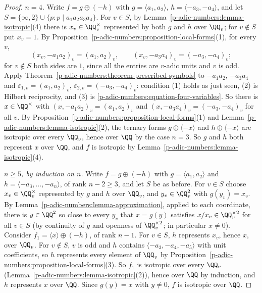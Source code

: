 \begin{proof}
\emph{$n = 4$.} Write $f = g \oplus (-h)$ with $g = \langle a_1, a_2\rangle$, $h = \langle -a_3, -a_4\rangle$, and let $S = \{\infty, 2\} \cup \{p : p \mid a_1a_2a_3a_4\}$. For $v \in S$, by
Lemma~\ref{p-adic-numbers:lemma-isotropic}(4) there is $x_v \in \QQ_v^\times$ represented by both $g$ and $h$ over $\QQ_v$; for $v \notin S$ put $x_v = 1$. By Proposition~\ref{p-adic-numbers:proposition-local-forms}(1),
for every $v$,
\begin{equation}\label{p-adic-numbers:equation-four-variables}
(x_v, -a_1a_2)_v = (a_1, a_2)_v, \qquad (x_v, -a_3a_4)_v = (-a_3, -a_4)_v ;
\end{equation}
for $v \notin S$ both sides are $1$, since all the entries are $v$-adic units and $v$ is odd. Apply Theorem~\ref{p-adic-numbers:theorem-prescribed-symbols} to $-a_1a_2$, $-a_3a_4$ and
$\varepsilon_{1,v} = (a_1, a_2)_v$, $\varepsilon_{2,v} = (-a_3, -a_4)_v$: condition (1) holds as just seen, (2) is Hilbert reciprocity, and (3) is \eqref{p-adic-numbers:equation-four-variables}. So there is $x \in \QQ^\times$
with $(x, -a_1a_2)_v = (a_1, a_2)_v$ and $(x, -a_3a_4)_v = (-a_3, -a_4)_v$ for all $v$. By Proposition~\ref{p-adic-numbers:proposition-local-forms}(1) and Lemma~\ref{p-adic-numbers:lemma-isotropic}(2), the
ternary forms $g \oplus \langle -x\rangle$ and $h \oplus \langle -x\rangle$ are isotropic over every $\QQ_v$, hence over $\QQ$ by the case $n = 3$. So $g$ and $h$ both represent $x$ over $\QQ$, and $f$ is isotropic
by Lemma~\ref{p-adic-numbers:lemma-isotropic}(4).

\emph{$n \geq 5$, by induction on $n$.} Write $f = g \oplus (-h)$ with $g = \langle a_1, a_2\rangle$ and $h = \langle -a_3, \ldots, -a_n\rangle$, of rank $n - 2 \geq 3$, and let $S$ be as before. For $v \in S$ choose
$x_v \in \QQ_v^\times$ represented by $g$ and $h$ over $\QQ_v$, and $y_v \in \QQ_v^2$ with $g(y_v) = x_v$. By Lemma~\ref{p-adic-numbers:lemma-approximation}, applied to each coordinate, there is $y \in \QQ^2$ so close to every
$y_v$ that $x = g(y)$ satisfies $x/x_v \in \QQ_v^{\times2}$ for all $v \in S$ (by continuity of $g$ and openness of $\QQ_v^{\times2}$; in particular $x \neq 0$). Consider $f_1 = \langle x\rangle \oplus (-h)$, of rank $n - 1$. For
$v \in S$, $h$ represents $x_v$, hence $x$, over $\QQ_v$. For $v \notin S$, $v$ is odd and $h$ contains $\langle -a_3, -a_4, -a_5\rangle$ with unit coefficients, so $h$ represents every element of $\QQ_v$ by
Proposition~\ref{p-adic-numbers:proposition-local-forms}(3). So $f_1$ is isotropic over every $\QQ_v$ (Lemma~\ref{p-adic-numbers:lemma-isotropic}(2)), hence over $\QQ$ by induction, and $h$ represents $x$ over $\QQ$.
Since $g(y) = x$ with $y \neq 0$, $f$ is isotropic over $\QQ$.
\end{proof}

